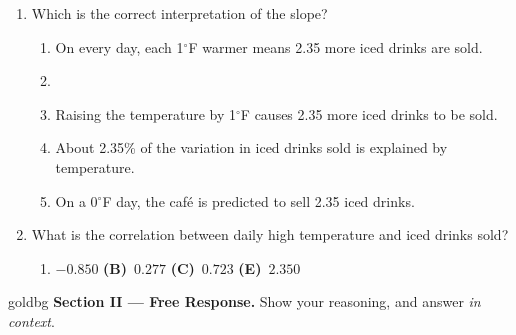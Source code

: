 \documentclass[12pt]{article}
\begin{document}
\begin{enumerate}[leftmargin=1.9em, itemsep=0.08in]

  \item Which is the correct interpretation of the slope?
        \begin{enumerate}[label=\textbf{(\Alph*)}, leftmargin=2.2em, itemsep=0pt]
          \item On every day, each 1$^\circ$F warmer means 2.35 more iced drinks are sold.
          \item {}
          \item Raising the temperature by 1$^\circ$F causes 2.35 more iced drinks to be sold.
          \item About 2.35\% of the variation in iced drinks sold is explained by temperature.
          \item On a 0$^\circ$F day, the caf\'e is predicted to sell 2.35 iced drinks.
                \hfill{}\rule[-0.2in]{0pt}{0.48in}
        \end{enumerate}

  \item What is the correlation between daily high temperature and iced drinks sold?
        \hfill{}\rule[-0.2in]{0pt}{0.48in}
        \begin{enumerate}[label=\textbf{(\Alph*)}, leftmargin=2.2em, itemsep=0pt]
          \item $-0.850$ \hfill \textbf{(B)}\ $0.277$ \hfill \textbf{(C)}\ $0.723$ \hfill
                 \hfill \textbf{(E)}\ $2.350$ \hspace*{2em}
        \end{enumerate}

\end{enumerate}

\boxguard[22]
\begin{headlinebox}{goldbg}
\small
\textbf{Section II --- Free Response.} Show your reasoning, and answer \emph{in context}.
\end{headlinebox}
\end{document}
